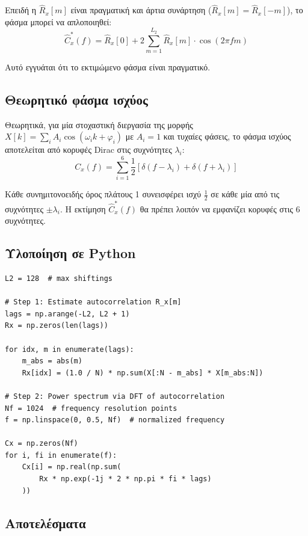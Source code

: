 \documentclass[a4paper,12pt]{article}
\begin{document}
Επειδή η $\hat{R}_x[m]$ είναι πραγματική και άρτια συνάρτηση ($\hat{R}_x[m] = \hat{R}_x[-m]$), το φάσμα μπορεί να απλοποιηθεί:
\begin{equation}
    \hat{C}_x^*(f) = \hat{R}_x[0] + 2\sum_{m=1}^{L_2} \hat{R}_x[m] \cdot \cos(2\pi f m)
    \label{eq:power_spectrum_real}
\end{equation}

Αυτό εγγυάται ότι το εκτιμώμενο φάσμα είναι πραγματικό.

\subsection{Θεωρητικό φάσμα ισχύος}

Θεωρητικά, για μία στοχαστική διεργασία της μορφής $X[k] = \sum_i A_i \cos(\omega_i k + \varphi_i)$ με $A_i = 1$ και τυχαίες φάσεις, το φάσμα ισχύος αποτελείται από κορυφές Dirac στις συχνότητες $\lambda_i$:
\begin{equation}
    C_x(f) = \sum_{i=1}^{6} \frac{1}{2} \left[\delta(f - \lambda_i) + \delta(f + \lambda_i)\right]
\end{equation}

Κάθε συνημιτονοειδής όρος πλάτους 1 συνεισφέρει ισχύ $\frac{1}{2}$ σε κάθε μία από τις συχνότητες $\pm\lambda_i$. Η εκτίμηση $\hat{C}_x^*(f)$ θα πρέπει λοιπόν να εμφανίζει κορυφές στις 6 συχνότητες.

\subsection{Υλοποίηση σε Python}

\begin{lstlisting}[style=python, caption={Εκτίμηση φάσματος ισχύος μέσω αυτοσυσχέτισης}]
L2 = 128  # max shiftings

# Step 1: Estimate autocorrelation R_x[m]
lags = np.arange(-L2, L2 + 1)
Rx = np.zeros(len(lags))

for idx, m in enumerate(lags):
    m_abs = abs(m)
    Rx[idx] = (1.0 / N) * np.sum(X[:N - m_abs] * X[m_abs:N])

# Step 2: Power spectrum via DFT of autocorrelation
Nf = 1024  # frequency resolution points
f = np.linspace(0, 0.5, Nf)  # normalized frequency

Cx = np.zeros(Nf)
for i, fi in enumerate(f):
    Cx[i] = np.real(np.sum(
        Rx * np.exp(-1j * 2 * np.pi * fi * lags)
    ))
\end{lstlisting}

\subsection{Αποτελέσματα}
\end{document}
